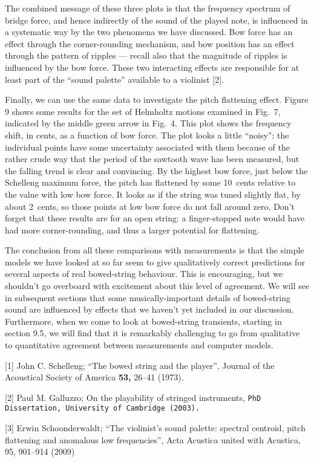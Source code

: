   The combined message of these three plots is that the frequency spectrum of 
  bridge force, and hence indirectly of the sound of the played note, is 
  influenced in a systematic way by the two phenomena we have discussed. Bow 
  force has an effect through the corner-rounding mechanism, and bow position 
  has an effect through the pattern of ripples — recall also that the magnitude 
  of ripples is influenced by the bow force. These two interacting effects are 
  responsible for at least part of the “sound palette” available to a violinist 
  [2]. 

  Finally, we can use the same data to investigate the pitch flattening effect. 
  Figure 9 shows some results for the set of Helmholtz motions examined in 
  Fig.\ 7, indicated by the middle green arrow in Fig.\ 4. This plot shows the 
  frequency shift, in cents, as a function of bow force. The plot looks a 
  little “noisy”: the individual points have some uncertainty associated with 
  them because of the rather crude way that the period of the sawtooth wave has 
  been measured, but the falling trend is clear and convincing. By the highest 
  bow force, just below the Schelleng maximum force, the pitch has flattened by 
  some 10~cents relative to the value with low bow force. It looks as if the 
  string was tuned slightly flat, by about 2~cents, so those points at low bow 
  force do not fall around zero. Don’t forget that these results are for an 
  open string: a finger-stopped note would have had more corner-rounding, and 
  thus a larger potential for flattening. 


  The conclusion from all these comparisons with measurements is that the 
  simple models we have looked at so far seem to give qualitatively correct 
  predictions for several aspects of real bowed-string behaviour. This is 
  encouraging, but we shouldn’t go overboard with excitement about this level 
  of agreement. We will see in subsequent sections that some 
  musically-important details of bowed-string sound are influenced by effects 
  that we haven’t yet included in our discussion. Furthermore, when we come to 
  look at bowed-string transients, starting in section 9.5, we will find that 
  it is remarkably challenging to go from qualitative to quantitative agreement 
  between measurements and computer models. 



  \sectionreferences{}[1] John C. Schelleng; ``The bowed string and the 
  player'', Journal of the Acoustical Society of America \textbf{53, }26–41 
  (1973). 

  [2] Paul M. Galluzzo; On the playability of stringed instruments, \tt{}PhD 
  Dissertation\rm{}, University of Cambridge (2003). 

  [3] Erwin Schoonderwaldt; ``The violinist’s sound palette: spectral centroid, 
  pitch flattening and anomalous low frequencies'', Acta Acustica united with 
  Acustica, 95, 901--914 (2009) 